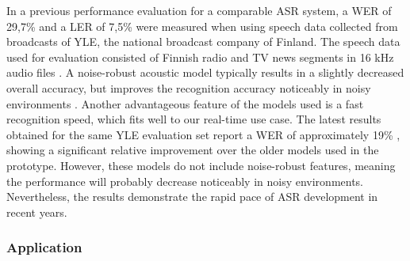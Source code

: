 \documentclass[english, 12pt, a4paper, pdftex, elec, utf8]{aaltothesis}
\begin{document}
In a previous performance evaluation for a comparable ASR system, a WER of 29,7\% and a LER of 7,5\% were measured when using speech data collected from broadcasts of YLE, the national broadcast company of Finland. The speech data used for evaluation consisted of Finnish radio and TV news segments in 16 kHz audio files \cite{mansikkaniemi2013unsupervised}. A noise-robust acoustic model typically results in a slightly decreased overall accuracy, but improves the recognition accuracy noticeably in noisy environments \cite{kallasjoki2016}. Another advantageous feature of the models used is a fast recognition speed, which fits well to our real-time use case. The latest results obtained for the same YLE evaluation set report a WER of approximately 19\% \cite{mansikka17parliament}, showing a significant relative improvement over the older models used in the prototype. However, these models do not include noise-robust features, meaning the performance will probably decrease noticeably in noisy environments. Nevertheless, the results demonstrate the rapid pace of ASR development in recent years. 

\subsubsection{Application} \label{sec:application}
\end{document}
